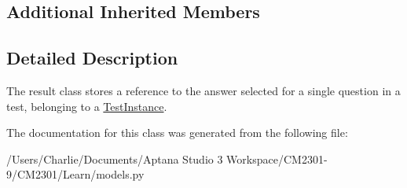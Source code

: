 \subsection*{Additional Inherited Members}


\subsection{Detailed Description}
The result class stores a reference to the answer selected for a single question in a test, belonging to a \hyperlink{class_learn_1_1models_1_1_test_instance}{Test\-Instance}. 

The documentation for this class was generated from the following file\-:\begin{DoxyCompactItemize}
\item 
/\-Users/\-Charlie/\-Documents/\-Aptana Studio 3 Workspace/\-C\-M2301-\/9/\-C\-M2301/\-Learn/models.\-py\end{DoxyCompactItemize}
